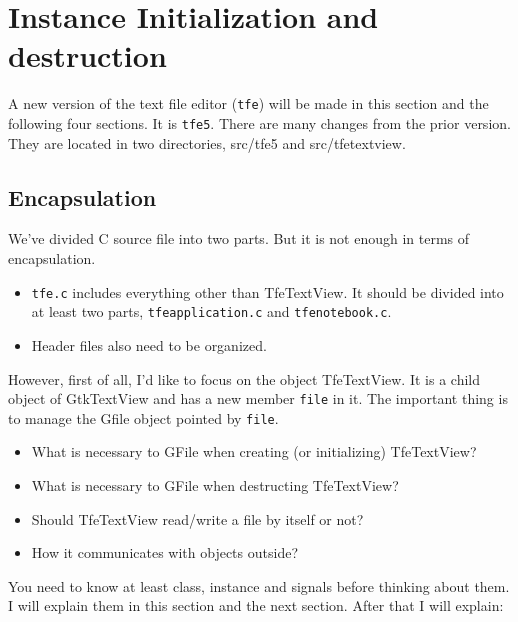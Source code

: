 \section{Instance Initialization and
destruction}\label{instance-initialization-and-destruction}

A new version of the text file editor (\passthrough{\lstinline!tfe!})
will be made in this section and the following four sections. It is
\passthrough{\lstinline!tfe5!}. There are many changes from the prior
version. They are located in two directories, src/tfe5 and
src/tfetextview.

\subsection{Encapsulation}\label{encapsulation}

We've divided C source file into two parts. But it is not enough in
terms of encapsulation.

\begin{itemize}
\tightlist
\item
  \passthrough{\lstinline!tfe.c!} includes everything other than
  TfeTextView. It should be divided into at least two parts,
  \passthrough{\lstinline!tfeapplication.c!} and
  \passthrough{\lstinline!tfenotebook.c!}.
\item
  Header files also need to be organized.
\end{itemize}

However, first of all, I'd like to focus on the object TfeTextView. It
is a child object of GtkTextView and has a new member
\passthrough{\lstinline!file!} in it. The important thing is to manage
the Gfile object pointed by \passthrough{\lstinline!file!}.

\begin{itemize}
\tightlist
\item
  What is necessary to GFile when creating (or initializing)
  TfeTextView?
\item
  What is necessary to GFile when destructing TfeTextView?
\item
  Should TfeTextView read/write a file by itself or not?
\item
  How it communicates with objects outside?
\end{itemize}

You need to know at least class, instance and signals before thinking
about them. I will explain them in this section and the next section.
After that I will explain:

